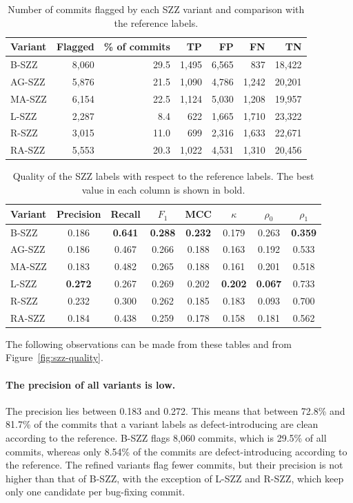 \documentclass[12pt,a4paper,oneside]{report}
\newcommand{\rhoz}{\rho_0}
\newcommand{\rhoo}{\rho_1}
\begin{document}
\begin{table}[htbp]
\centering\small
\caption{Number of commits flagged by each SZZ variant and comparison with
the reference labels.}
\label{tab:counts}
\begin{tabular}{@{}lrrrrrr@{}}
\toprule
Variant & Flagged & \% of commits & TP & FP & FN & TN \\
\midrule
B-SZZ & 8,060 & 29.5 & 1,495 & 6,565 & 837 & 18,422 \\
AG-SZZ & 5,876 & 21.5 & 1,090 & 4,786 & 1,242 & 20,201 \\
MA-SZZ & 6,154 & 22.5 & 1,124 & 5,030 & 1,208 & 19,957 \\
L-SZZ & 2,287 & 8.4 & 622 & 1,665 & 1,710 & 23,322 \\
R-SZZ & 3,015 & 11.0 & 699 & 2,316 & 1,633 & 22,671 \\
RA-SZZ & 5,553 & 20.3 & 1,022 & 4,531 & 1,310 & 20,456 \\
\bottomrule
\end{tabular}
\end{table}

\begin{table}[htbp]
\centering\small
\caption{Quality of the SZZ labels with respect to the reference labels. The
best value in each column is shown in bold.}
\label{tab:quality}
\begin{tabular}{@{}lccccccc@{}}
\toprule
Variant & Precision & Recall & $F_1$ & MCC & $\kappa$ & $\rhoz$ & $\rhoo$ \\
\midrule
B-SZZ & 0.186 & \textbf{0.641} & \textbf{0.288} & \textbf{0.232} & 0.179 & 0.263 & \textbf{0.359} \\
AG-SZZ & 0.186 & 0.467 & 0.266 & 0.188 & 0.163 & 0.192 & 0.533 \\
MA-SZZ & 0.183 & 0.482 & 0.265 & 0.188 & 0.161 & 0.201 & 0.518 \\
L-SZZ & \textbf{0.272} & 0.267 & 0.269 & 0.202 & \textbf{0.202} & \textbf{0.067} & 0.733 \\
R-SZZ & 0.232 & 0.300 & 0.262 & 0.185 & 0.183 & 0.093 & 0.700 \\
RA-SZZ & 0.184 & 0.438 & 0.259 & 0.178 & 0.158 & 0.181 & 0.562 \\
\bottomrule
\end{tabular}
\end{table}

The following observations can be made from these tables and from
Figure~\ref{fig:szz-quality}.

\paragraph{The precision of all variants is low.} The precision lies between
0.183 and 0.272. This means that between 72.8\% and 81.7\% of the commits
that a variant labels as defect-introducing are clean according to the
reference. B-SZZ flags 8,060 commits, which is 29.5\% of all commits, whereas
only 8.54\% of the commits are defect-introducing according to the reference.
The refined variants flag fewer commits, but their precision is not higher
than that of B-SZZ, with the exception of L-SZZ and R-SZZ, which keep only
one candidate per bug-fixing commit.
\end{document}
